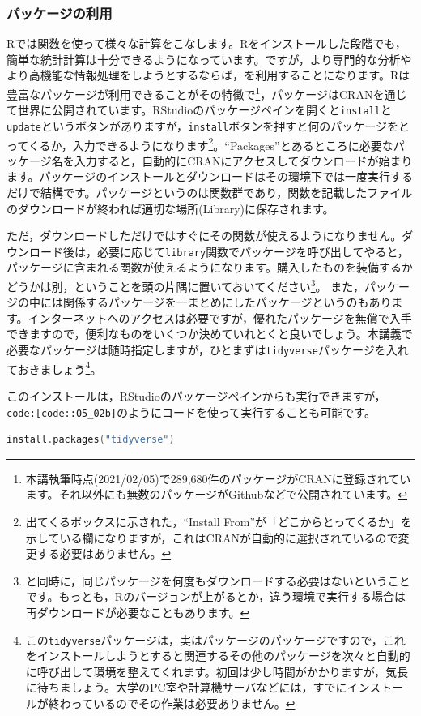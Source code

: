\documentclass{ltjbook}
\begin{document}
\subsubsection{パッケージの利用}
\label{HowToUseRpackage}
Rでは関数を使って様々な計算をこなします。Rをインストールした段階でも，簡単な統計計算は十分できるようになっています。ですが，より専門的な分析やより高機能な情報処理をしようとするならば，を利用することになります。Rは豊富なパッケージが利用できることがその特徴で\footnote{本講執筆時点(2021/02/05)で289,680件のパッケージがCRANに登録されています。それ以外にも無数のパッケージがGithubなどで公開されています。}，パッケージはCRANを通じて世界に公開されています。RStudioのパッケージペインを開くと\texttt{install}と\texttt{update}というボタンがありますが，\texttt{install}ボタンを押すと何のパッケージをとってくるか，入力できるようになります\footnote{出てくるボックスに示された，``Install From''が「どこからとってくるか」を示している欄になりますが，これはCRANが自動的に選択されているので変更する必要はありません。}。``Packages''とあるところに必要なパッケージ名を入力すると，自動的にCRANにアクセスしてダウンロードが始まります。パッケージのインストールとダウンロードはその環境下では一度実行するだけで結構です。パッケージというのは関数群であり，関数を記載したファイルのダウンロードが終われば適切な場所(Library)に保存されます。

ただ，ダウンロードしただけではすぐにその関数が使えるようになりません。ダウンロード後は，必要に応じて\texttt{library}関数でパッケージを呼び出してやると，パッケージに含まれる関数が使えるようになります。購入したものを装備するかどうかは別，ということを頭の片隅に置いておいてください\footnote{と同時に，同じパッケージを何度もダウンロードする必要はないということです。もっとも，Rのバージョンが上がるとか，違う環境で実行する場合は再ダウンロードが必要なこともあります。}。
また，パッケージの中には関係するパッケージを一まとめにしたパッケージというのもあります。インターネットへのアクセスは必要ですが，優れたパッケージを無償で入手できますので，便利なものをいくつか決めていれとくと良いでしょう。本講義で必要なパッケージは随時指定しますが，ひとまずは\texttt{tidyverse}パッケージ\citep{tidyverse}を入れておきましょう\footnote{この\texttt{tidyverse}パッケージは，実はパッケージのパッケージですので，これをインストールしようとすると関連するその他のパッケージを次々と自動的に呼び出して環境を整えてくれます。初回は少し時間がかかりますが，気長に待ちましょう。大学のPC室や計算機サーバなどには，すでにインストールが終わっているのでその作業は必要ありません。}。

このインストールは，RStudioのパッケージペインからも実行できますが，\texttt{code:\ref{code::05_02b}}のようにコードを使って実行することも可能です。
\begin{lstlisting}[language=c++,label={code::05_02b},caption={コードからインストールする}]
install.packages("tidyverse")
\end{lstlisting}
\end{document}
